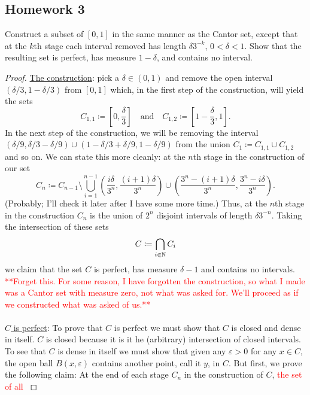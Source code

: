 \subsection{Homework 3}
\begin{problem}
  Construct a subset of $[0,1]$ in the same manner as the Cantor set,
  except that at the $k$th stage each interval removed has length
  $\delta 3^{-k}$, $0<\delta<1$. Show that the resulting set is perfect,
  has measure $1-\delta$, and contains no interval.
\end{problem}
\begin{proof}
  \underline{The construction}: pick a $\delta\in(0,1)$ and remove the
  open interval $(\delta/3,1-\delta/3)$ from $[0,1]$ which, in the first
  step of the construction, will yield the sets
  \[
    C_{1,1}\coloneq\left[0,\frac{\delta}{3}\right]\quad\text{and}\quad
    C_{1,2}\coloneq\left[1-\frac{\delta}{3},1\right].
  \]
  In the next step of the construction, we will be removing the interval
  $(\delta/9,\delta/3-\delta/9)\cup(1-\delta/3+\delta/9,1-\delta/9)$ from
  the union $C_1\coloneq C_{1,1}\cup C_{1,2}$ and so on. We can state this
  more cleanly: at the $n$th stage in the construction of our set
  \[
    C_n\coloneq%
    C_{n-1}\setminus\bigcup_{i=1}^{n-1}%
    \left(\frac{i\delta}{3^n},\frac{(i+1)\delta}{3^n}\right)\cup%
    \left(\frac{3^n-(i+1)\delta}{3^n},\frac{3^n-i\delta}{3^n}\right).
  \]
  (Probably; I'll check it later after I have some more time.)  Thus, at
  the $n$th stage in the construction $C_n$ is the union of $2^n$ disjoint
  intervals of length $\delta 3^{-n}$. Taking the intersection of these
  sets
  \[
    C\coloneq\bigcap_{i\in\mathbb{N}} C_i
  \]
  we claim that the set $C$ is perfect, has measure $\delta-1$ and contains
  no intervals. \textcolor{Red}{**Forget this. For some reason, I have
    forgotten the construction, so what I made was a Cantor set with
    measure zero, not what was asked for. We'll proceed as if we
    constructed what was asked of us.**}
  \\\\
  \underline{$C$ is perfect}: To prove that $C$ is perfect we must show
  that $C$ is closed and dense in itself. $C$ is closed because it is it he
  (arbitrary) intersection of closed intervals. To see that $C$ is dense in
  itself we must show that given any $\varepsilon>0$ for any $x\in C$, the
  open ball $B(x,\varepsilon)$ contains another point, call it $y$, in
  $C$. But first, we prove the following claim: At the end of each stage
  $C_n$ in the construction of $C$, \textcolor{Red}{the set of all
}
\end{proof}
